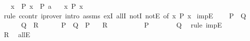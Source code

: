 \begin{isabellebody}
\ \ \ {\isachardoublequoteopen}{\isasymforall}x{\isachardot}{\kern0pt}\ {\isasymnot}\ P\ x\ {\isasymLongrightarrow}\ P\ a{\isachardoublequoteclose}\isanewline
\ \ \ {\isachardoublequoteopen}{\isasymexists}x{\isachardot}{\kern0pt}\ P\ x{\isachardoublequoteclose}\isanewline
%
\isadelimproof
\ \ %
\endisadelimproof
%
\isatagproof
{}\isamarkupfalse%
\ {\isacharparenleft}{\kern0pt}rule\ ccontr{\isacharparenright}{\kern0pt}\ {\isacharparenleft}{\kern0pt}iprover\ intro{\isacharcolon}{\kern0pt}\ assms\ exI\ allI\ notI\ notE\ {\isacharbrackleft}{\kern0pt}of\ {\isachardoublequoteopen}{\isasymexists}x{\isachardot}{\kern0pt}\ P\ x{\isachardoublequoteclose}{\isacharbrackright}{\kern0pt}{\isacharparenright}{\kern0pt}%
\endisatagproof
{\isafoldproof}%
%
\isadelimproof
%
\endisadelimproof
%
\isadelimdocument
%
\endisadelimdocument
%
\isatagdocument
%
\isamarkuptrue%
%
\endisatagdocument
{\isafolddocument}%
%
\isadelimdocument
%
\endisadelimdocument
{}\isamarkupfalse%
\ impE{\isacharprime}{\kern0pt}{\isacharcolon}{\kern0pt}\isanewline
\ \ \ {}{\isacharcolon}{\kern0pt}\ {\isachardoublequoteopen}P\ {\isasymlongrightarrow}\ Q{\isachardoublequoteclose}\isanewline
\ \ \ \ \ {}{\isacharcolon}{\kern0pt}\ {\isachardoublequoteopen}Q\ {\isasymLongrightarrow}\ R{\isachardoublequoteclose}\isanewline
\ \ \ \ \ {}{\isacharcolon}{\kern0pt}\ {\isachardoublequoteopen}P\ {\isasymlongrightarrow}\ Q\ {\isasymLongrightarrow}\ P{\isachardoublequoteclose}\isanewline
\ \ \ R\isanewline
%
\isadelimproof
%
\endisadelimproof
%
\isatagproof
{}\isamarkupfalse%
\ {\isacharminus}{\kern0pt}\isanewline
\ \ \isamarkupfalse%
\ {}\ \ {}\ \isamarkupfalse%
\ P\ \isacommand{{\isachardot}{\kern0pt}}\isamarkupfalse%
\isanewline
\ \ \isamarkupfalse%
\ {}\ \isamarkupfalse%
\ Q\ \isamarkupfalse%
\ {\isacharparenleft}{\kern0pt}rule\ impE{\isacharparenright}{\kern0pt}\isanewline
\ \ \isamarkupfalse%
\ {}\ \isamarkupfalse%
\ R\ \isacommand{{\isachardot}{\kern0pt}}\isamarkupfalse%
\isanewline
{}\isamarkupfalse%
%
\endisatagproof
{\isafoldproof}%
%
\isadelimproof
\isanewline
%
\endisadelimproof
\isanewline
{}\isamarkupfalse%
\ allE{\isacharprime}{\kern0pt}{\isacharcolon}{\kern0pt}\isanewline

\end{isabellebody}
